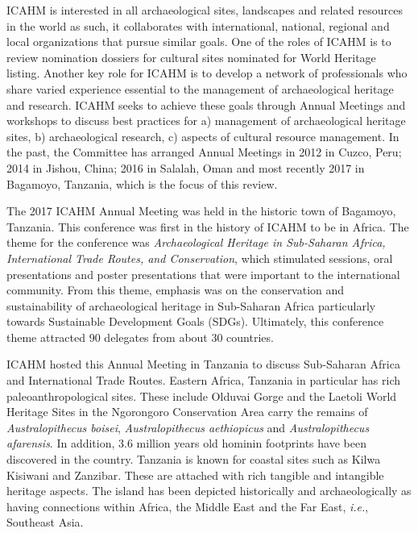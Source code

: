 ICAHM is interested in all archaeological sites, landscapes and related resources in the world as such, it collaborates with international, national, regional and local organizations that pursue similar goals. One of the roles of ICAHM is to review nomination dossiers for cultural sites nominated for World Heritage listing. Another key role for ICAHM is to develop a network of professionals who share varied experience essential to the management of archaeological heritage and research. ICAHM seeks to achieve these goals through Annual Meetings and workshops to discuss best practices for a) management of archaeological heritage sites, b) archaeological research, c) aspects of cultural resource management. In the past, the Committee has arranged Annual Meetings in 2012 in Cuzco, Peru; 2014 in Jishou, China; 2016 in Salalah, Oman and most recently 2017 in Bagamoyo, Tanzania, which is the focus of this review.

The 2017 ICAHM Annual Meeting was held in the historic town of Bagamoyo, Tanzania. This conference was first in the history of ICAHM to be in Africa. The theme for the conference was \emph{Archaeological Heritage in Sub-Saharan Africa, International Trade Routes, and Conservation}, which stimulated sessions, oral presentations and poster presentations that were important to the international community. From this theme, emphasis was on the conservation and sustainability of archaeological heritage in Sub-Saharan Africa particularly towards Sustainable Development Goals (SDGs). Ultimately, this conference theme attracted 90 delegates from about 30 countries.


ICAHM hosted this Annual Meeting in Tanzania to discuss Sub-Saharan Africa and International Trade Routes. Eastern Africa, Tanzania in particular has rich paleoanthropological sites. These include Olduvai Gorge and the Laetoli World Heritage Sites in the Ngorongoro Conservation Area carry the remains of \emph{Australopithecus boisei}, \emph{Australopithecus aethiopicus} and \emph{Australopithecus afarensis}. In addition, \num{3.6} million years old hominin footprints have been discovered in the country. Tanzania is known for coastal sites such as Kilwa Kisiwani and Zanzibar. These are attached with rich tangible and intangible heritage aspects. The island has been depicted historically and archaeologically as having connections within Africa, the Middle East and the Far East, \emph{i.e.}, Southeast Asia.

